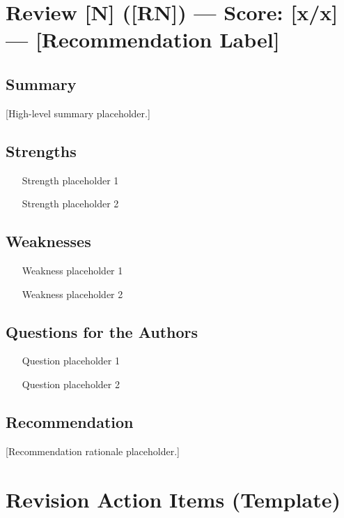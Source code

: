 \documentclass[11pt,a4paper]{article}
\begin{document}
\newpage
\section{Review [N] ([RN]) --- Score: [x/x] --- [Recommendation Label]}

\subsection{Summary}
[High-level summary placeholder.]

\subsection{Strengths}
\begin{itemize}[leftmargin=2em]
  \item [Strength placeholder 1]
  \item [Strength placeholder 2]
\end{itemize}

\subsection{Weaknesses}
\begin{enumerate}[leftmargin=2em]
  \item [Weakness placeholder 1]
  \item [Weakness placeholder 2]
\end{enumerate}

\subsection{Questions for the Authors}
\begin{enumerate}[leftmargin=2em]
  \item [Question placeholder 1]
  \item [Question placeholder 2]
\end{enumerate}

\subsection{Recommendation}
[Recommendation rationale placeholder.]


\newpage
\section{Revision Action Items (Template)}
\end{document}
